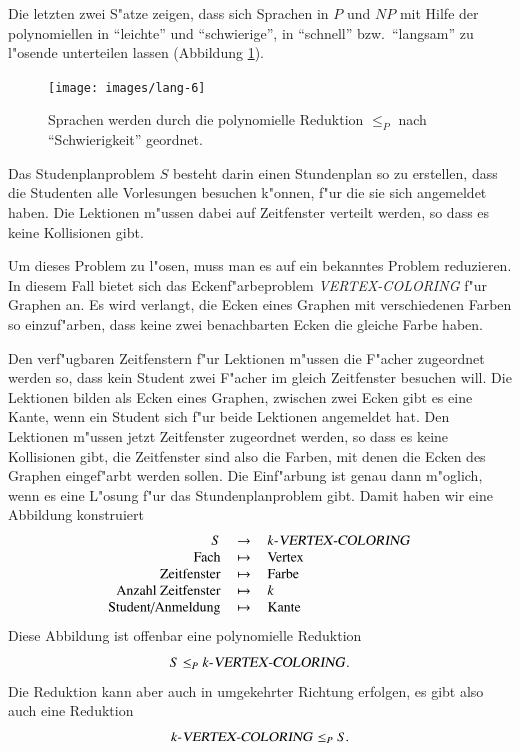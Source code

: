 Die letzten zwei S"atze zeigen, dass sich Sprachen in $P$ und $NP$
mit Hilfe der polynomiellen in ``leichte'' und ``schwierige'',
in ``schnell'' bzw.~``langsam'' zu l"osende unterteilen lassen
(Abbildung \ref{pnporder}).
\begin{figure}
\begin{center}
\texttt{[image: images/lang-6]}
\end{center}
\caption{Sprachen werden durch die polynomielle Reduktion $\le_P$
nach ``Schwierigkeit'' geordnet.\label{pnporder}}
\end{figure}%

\begin{beispiel}
Das Studenplanproblem $S$ besteht darin
einen Stundenplan so zu erstellen, dass die Studenten alle
Vorlesungen besuchen k"onnen, f"ur die sie sich angemeldet haben.
Die Lektionen m"ussen dabei auf Zeitfenster verteilt werden,
so dass es keine Kollisionen gibt.

Um dieses Problem zu l"osen, muss man es auf ein bekanntes
Problem reduzieren. In diesem Fall bietet sich das Eckenf"arbeproblem
\textsl{VERTEX-COLORING}
f"ur Graphen an. Es wird verlangt, die Ecken eines Graphen mit 
verschiedenen Farben so einzuf"arben, dass keine zwei benachbarten
Ecken die gleiche Farbe haben.

Den verf"ugbaren Zeitfenstern f"ur Lektionen m"ussen die F"acher zugeordnet werden
so, dass kein Student zwei F"acher im gleich Zeitfenster
besuchen will.
Die Lektionen bilden als Ecken eines Graphen, zwischen zwei
Ecken gibt es eine Kante, wenn ein Student sich f"ur beide 
Lektionen angemeldet hat. Den Lektionen m"ussen jetzt Zeitfenster
zugeordnet werden, so dass es keine Kollisionen gibt, die
Zeitfenster sind also die Farben, mit denen die Ecken  des
Graphen eingef"arbt werden sollen. Die Einf"arbung ist genau
dann m"oglich, wenn es eine L"osung f"ur das Stundenplanproblem gibt.
Damit haben wir eine Abbildung konstruiert
\[
\begin{tabular}{>{$}r<{$}>{$}c<{$}>{$}l<{$}}
S&\to&\text{$k$-\textsl{VERTEX-COLORING}}\\
\text{Fach}&\mapsto&\text{Vertex}\\
\text{Zeitfenster}&\mapsto&\text{Farbe}\\
\text{Anzahl Zeitfenster}&\mapsto&k\\
\text{Student/Anmeldung}&\mapsto&\text{Kante}
\end{tabular}
\]
Diese Abbildung ist offenbar eine polynomielle Reduktion
\[
S\le_P \text{$k$-\textsl{VERTEX-COLORING}}.
\]
Die Reduktion kann aber auch in umgekehrter Richtung erfolgen,
es gibt also auch eine Reduktion
\[
\text{$k$-\textsl{VERTEX-COLORING}}\le_P S.
\]
\end{beispiel}

